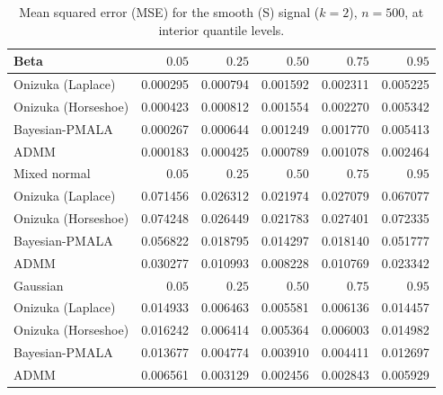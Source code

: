 \begin{table}[!htbp]
\centering
\small
\caption{Mean squared error (MSE) for the smooth (S) signal ($k=2$), $n=500$, at interior quantile levels.}
\label{tab:s_int_mse}
\begin{tabular}{lrrrrr}
\toprule
Beta & $0.05$ & $0.25$ & $0.50$ & $0.75$ & $0.95$ \\
\midrule
Onizuka (Laplace) & 0.000295 & 0.000794 & 0.001592 & 0.002311 & 0.005225 \\
Onizuka (Horseshoe) & 0.000423 & 0.000812 & 0.001554 & 0.002270 & 0.005342 \\
Bayesian-PMALA & 0.000267 & 0.000644 & 0.001249 & 0.001770 & 0.005413 \\
ADMM & 0.000183 & 0.000425 & 0.000789 & 0.001078 & 0.002464 \\
\midrule
Mixed normal & $0.05$ & $0.25$ & $0.50$ & $0.75$ & $0.95$ \\
\midrule
Onizuka (Laplace) & 0.071456 & 0.026312 & 0.021974 & 0.027079 & 0.067077 \\
Onizuka (Horseshoe) & 0.074248 & 0.026449 & 0.021783 & 0.027401 & 0.072335 \\
Bayesian-PMALA & 0.056822 & 0.018795 & 0.014297 & 0.018140 & 0.051777 \\
ADMM & 0.030277 & 0.010993 & 0.008228 & 0.010769 & 0.023342 \\
\midrule
Gaussian & $0.05$ & $0.25$ & $0.50$ & $0.75$ & $0.95$ \\
\midrule
Onizuka (Laplace) & 0.014933 & 0.006463 & 0.005581 & 0.006136 & 0.014457 \\
Onizuka (Horseshoe) & 0.016242 & 0.006414 & 0.005364 & 0.006003 & 0.014982 \\
Bayesian-PMALA & 0.013677 & 0.004774 & 0.003910 & 0.004411 & 0.012697 \\
ADMM & 0.006561 & 0.003129 & 0.002456 & 0.002843 & 0.005929 \\
\bottomrule
\end{tabular}
\end{table}

